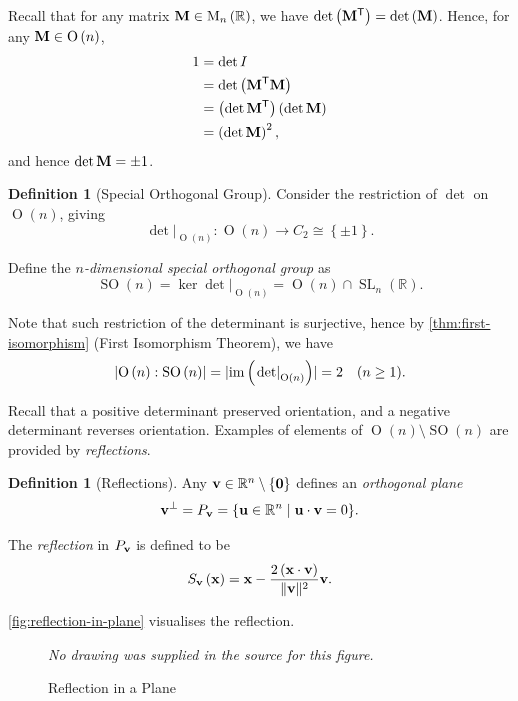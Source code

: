 \documentclass{article}
\theoremstyle{definition}
\newtheorem{definition}[theorem]{Definition}
\theoremstyle{remark}
\DeclarePairedDelimiter{\abs}{\lvert}{\rvert}
\newcommand{\pqty}[1]{\left(#1\right)}
\newcommand{\Bqty}[1]{\left\{#1\right\}}
\newcommand{\set}[2]{\{#1\mid #2\}}
\newcommand{\functiondomain}[3]{#1:#2\to #3}
\newcommand{\transpose}{^{\mathsf{T}}}
\newcommand{\isomorphic}{\cong}
\newcommand{\RR}{\mathbb{R}}
\newcommand{\SL}{\operatorname{SL}}
\newcommand{\img}{\operatorname{im}}
\DeclarePairedDelimiter{\norm}{\lVert}{\rVert}
\newcommand{\rightbar}[1]{\left.#1\right|}
\newcommand{\identityM}{I}
\newcommand{\matrixset}{\mathrm{M}}
\newcommand{\perppl}{^{\perp}}
\newcommand{\SO}{\operatorname{SO}}
\newcommand{\Or}{\operatorname{O}}
\begin{document}
Recall that for any matrix \(\vb{M} \in \matrixset_{n} \pqty{\RR}\), we have \(\det \pqty{\vb{M}\transpose} = \det \pqty{\vb{M}}\). Hence, for any \(\vb{M} \in \Or\pqty{n}\),
\begin{align*}
    1 &= \det \identityM \\
    &= \det \pqty{\vb{M}\transpose\vb{M}} \\
    &= \pqty{\det \vb{M}\transpose} \pqty{\det \vb{M}} \\
    &= \pqty{\det \vb{M}}^2,
\end{align*}
and hence \(\det \vb{M} = \pm 1\).

\begin{definition}[Special Orthogonal Group]
    \label{def:special-orthogonal-group}%
    Consider the restriction of \(\det\) on \(\Or\pqty{n}\), giving
    \[
        \functiondomain{\rightbar{\det}_{\Or\pqty{n}}}{\Or\pqty{n}}{C_2 \isomorphic \Bqty{\pm 1}}.
    \]

    Define the \emph{\(n\)-dimensional special orthogonal group} as
    \[
        \SO\pqty{n} = \ker \rightbar{\det}_{\Or\pqty{n}} = \Or\pqty{n} \cap \SL_n\pqty{\RR}.
    \]
\end{definition}

Note that such restriction of the determinant is surjective, hence by \autoref{thm:first-isomorphism} (First Isomorphism Theorem), we have
\[
    \abs{\Or\pqty{n} : \SO\pqty{n}} = \abs{\img \pqty{\rightbar{\det}_{\Or\pqty{n}}}} = 2 \quad (n\geq1).
\]

Recall that a positive determinant preserved orientation, and a negative determinant reverses orientation. Examples of elements of \(\Or\pqty{n} \setminus \SO\pqty{n}\) are provided by \emph{reflections}.

\begin{definition}[Reflections]
    \label{def:reflections}%
    Any \(\vb{v} \in \RR^n \setminus \Bqty{\vb{0}}\) defines an \emph{orthogonal plane}
    \[
        \vb{v}\perppl = P_{\vb{v}} = \set{\vb{u} \in \RR^n}{\vb{u} \cdot \vb{v} = 0}.
    \]

    The \emph{reflection} in \(P_{\vb{v}}\) is defined to be
    \[
        S_{\vb{v}} \pqty{\vb{x}} = \vb{x} - \frac{2 \pqty{\vb{x} \cdot \vb{v}}}{\norm{\vb{v}}^2} \vb{v}.
    \]
\end{definition}

\autoref{fig:reflection-in-plane} visualises the reflection.

\begin{figure}[ht!]
    \centering
    \emph{No drawing was supplied in the source for this figure.}\par
\caption{Reflection in a Plane}
    \label{fig:reflection-in-plane}
\end{figure}
\end{document}
